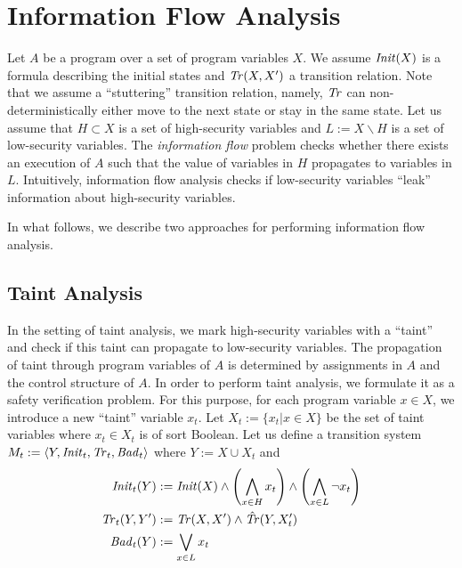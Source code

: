 
\section{Information Flow Analysis}

Let $A$ be a program over a set of program variables $X$. We assume $\mathit{Init}(X)$ is a formula describing the initial states and $\mathit{Tr}(X,X')$ a transition relation. Note that we assume a ``stuttering'' transition relation, namely, $\mathit{Tr}$ can non-deterministically either move to the next state or stay in the same state. Let us assume that $H \subset X$ is a set of high-security variables and $L := X\backslash H$ is a set of low-security variables. The \emph{information flow} problem checks whether there exists an execution of $A$ such that the value of variables in $H$ propagates to variables in $L$. Intuitively, information flow analysis checks if low-security variables ``leak'' information about high-security variables.

In what follows, we describe two approaches for performing information flow analysis.

\subsection{Taint Analysis}  \label{taint-analysis}

In the setting of taint analysis, we mark high-security variables with a ``taint'' and check if this taint can propagate to low-security variables.
The propagation of taint through program variables of $A$ is determined by assignments in $A$ and the control structure of $A$. In order to perform taint analysis, we formulate it as a safety verification problem. For this purpose, for each program variable $x\in X$, we introduce a new ``taint'' variable $x_t$. Let $X_t := \{x_t | x\in X\}$ be the set of taint variables where $x_t\in X_t$ is of sort Boolean. %
Let us define a transition system $M_t := \langle Y, \mathit{Init}_t,\mathit{Tr}_t,\mathit{Bad}_t\rangle$ where $Y := X\cup X_t$ and  
\begin{align}
    \mathit{Init}_t(Y) & := \mathit{Init}(X)\land\left(\bigwedge\limits_{x\in H}x_t\right)\land\left(\bigwedge\limits_{x\in L}\neg x_t\right)\\
    \mathit{Tr}_t(Y,Y') &:= \mathit{Tr}(X,X')\land\hat{\mathit{Tr}}(Y,X_t')\\
    \mathit{Bad}_t(Y) &:= \bigvee\limits_{x\in L} x_t
\end{align}


